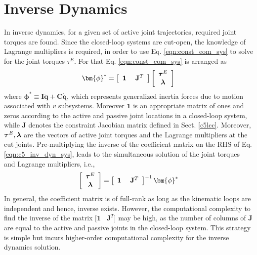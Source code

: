 {	\section{Inverse Dynamics}
	\label{c5invdyn}
	In inverse dynamics, for a given set of active joint trajectories, required joint torques are found. Since the closed-loop systems are cut-open, the knowledge of Lagrange multipliers is required, in order to use Eq. \ref{eqn:const_eom_sys} to solve for the joint torques  \mbox{\boldmath$\tau$}$^E$. For that Eq. \ref{eqn:const_eom_sys} is arranged as
	\begin{equation}
	\label{eqn:c5_inv_dyn_sys}
	\bm{\phi}^* = \left[ \begin{array}{cc}
	\textbf{1} & \hspace*{3pt}\textbf{J$^T$}\\
	\end{array} \right]
	\left[ \begin{array}{c}
	\mbox{\boldmath$\tau$}^E\\
	\mbox{\boldmath$\lambda$}
	\end{array} \right]
	\end{equation}
	where $\bm{\phi}^* \equiv \textbf{I}\mathbf{\ddot{q}} + \mathbf{C\dot{q}}$, which represents generalized inertia forces due to motion associated with $v$ subsystems. Moreover $\mathbf{1}$ is an appropriate matrix of ones and zeros according to the active and passive joint locations in a closed-loop system, while $\mathbf{J}$ denotes the constraint Jacobian matrix defined in Sect. \ref{c5lcc}. Moreover, $\mbox{\boldmath$\tau$}^E, \mbox{\boldmath$\lambda$}$ are the vectors of active joint torques and the Lagrange multipliers at the cut joints. Pre-multiplying the inverse of the coefficient matrix on the RHS of Eq. \ref{eqn:c5_inv_dyn_sys}, leads to the simultaneous solution of the joint torques and Lagrange multipliers, i.e., 
	\begin{equation}
	\left[ \begin{array}{c}
	\mbox{\boldmath$\tau$}^E\\
	\mbox{\boldmath$\lambda$}
	\end{array} \right] = \left[ \begin{array}{cc}
	\textbf{1} & \hspace*{3pt}\textbf{J$^T$}\\
	\end{array} \right]^{-1}\bm{\phi}^* 
	\end{equation}
In general, the coefficient matrix is of full-rank as long as the kinematic loops are independent and hence, inverse exists. However, the computational complexity to find the inverse of the matrix $\Big[\mathbf{1} \hspace{10pt} \mathbf{J}^T \Big]$ may be high, as the number of columns of \textbf{J} are equal to the active and passive joints in the closed-loop system. This strategy is simple but incurs higher-order computational complexity for the inverse dynamics solution.

}
